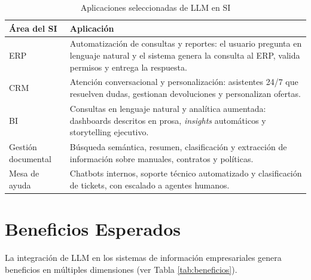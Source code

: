 \documentclass[12pt,a4paper,oneside]{article}
\begin{document}
\begin{table}[h!]
\centering
\caption{Aplicaciones seleccionadas de LLM en SI}
\label{tab:aplicaciones}
\begin{tabular}{p{4cm} p{10cm}}
\toprule
\textbf{Área del SI} & \textbf{Aplicación} \\
\midrule
ERP & Automatización de consultas y reportes: el usuario pregunta en lenguaje natural y el sistema genera la consulta al ERP, valida permisos y entrega la respuesta. \\
CRM & Atención conversacional y personalización: asistentes 24/7 que resuelven dudas, gestionan devoluciones y personalizan ofertas. \\
BI & Consultas en lenguaje natural y analítica aumentada: dashboards descritos en prosa, \textit{insights} automáticos y storytelling ejecutivo. \\
Gestión documental & Búsqueda semántica, resumen, clasificación y extracción de información sobre manuales, contratos y políticas. \\
Mesa de ayuda & Chatbots internos, soporte técnico automatizado y clasificación de tickets, con escalado a agentes humanos. \\
\bottomrule
\end{tabular}
\end{table}

\section{Beneficios Esperados}

La integración de LLM en los sistemas de información empresariales genera beneficios en múltiples dimensiones (ver Tabla \ref{tab:beneficios}).
\end{document}
